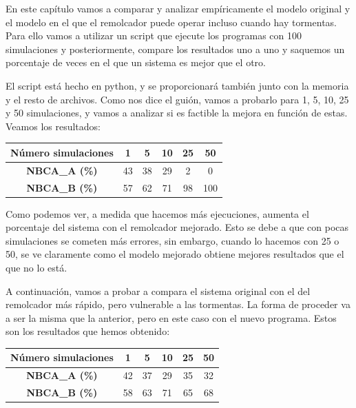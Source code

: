 \documentclass[11pt,a4paper]{report}
\begin{document}
En este capítulo vamos a comparar y analizar empíricamente el modelo original y el modelo en el que el remolcador puede operar incluso cuando hay tormentas. Para ello vamos a
utilizar un script que ejecute los programas con 100 simulaciones y posteriormente, compare los resultados uno a uno y saquemos un porcentaje de veces en el que un sistema es
mejor que el otro.

El script está hecho en python, y se proporcionará también junto con la memoria y el resto de archivos. Como nos dice el guión, vamos a probarlo para 1, 5, 10, 25 y 50 simulaciones,
y vamos a analizar si es factible la mejora en función de estas. Veamos los resultados:

\begin{table}[H]
\centering
\begin{tabular}{c|c|c|c|c|c}
\textbf{Número simulaciones} & \textbf{1} & \textbf{5} & \textbf{10} & \textbf{25} & \textbf{50} \\ \hline
\textbf{NBCA\_A (\%)}        & 43         & 38         & 29          & 2           & 0           \\ \hline
\textbf{NBCA\_B (\%)}        & 57         & 62         & 71          & 98          & 100         \\
\end{tabular}
\end{table}


Como podemos ver, a medida que hacemos más ejecuciones, aumenta el porcentaje del sistema con el remolcador mejorado. Esto se debe a que con pocas simulaciones se cometen más
errores, sin embargo, cuando lo hacemos con 25 o 50, se ve claramente como el modelo mejorado obtiene mejores resultados que el que no lo está.

A continuación, vamos a probar a compara el sistema original con el del remolcador más rápido, pero vulnerable a las tormentas. La forma de proceder va a ser la misma que la
anterior, pero en este caso con el nuevo programa. Estos son los resultados que hemos obtenido:

\begin{table}[H]
\centering
\begin{tabular}{c|c|c|c|c|c}
\textbf{Número simulaciones} & \textbf{1} & \textbf{5} & \textbf{10} & \textbf{25} & \textbf{50} \\ \hline
\textbf{NBCA\_A (\%)}        & 42         & 37         & 29          & 35          & 32          \\ \hline
\textbf{NBCA\_B (\%)}        & 58         & 63         & 71          & 65          & 68          \\
\end{tabular}
\end{table}
\end{document}
